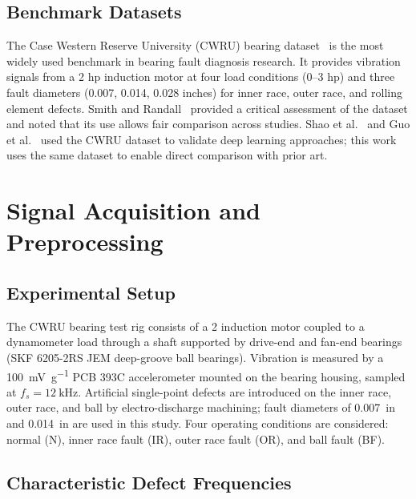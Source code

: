 \documentclass[conference,a4paper]{IEEEtran}[2015/08/26]
\begin{document}
\subsection{Benchmark Datasets}

The Case Western Reserve University (CWRU) bearing dataset~\cite{Loparo2003,
Smith2015} is the most widely used benchmark in bearing fault diagnosis
research. It provides vibration signals from a 2 hp induction motor
at four load conditions (0--3 hp) and three fault diameters
(0.007, 0.014, 0.028 inches) for inner race, outer race, and rolling
element defects. Smith and Randall~\cite{Smith2015} provided a
critical assessment of the dataset and noted that its use allows
fair comparison across studies. Shao et al.~\cite{Shao2017} and
Guo et al.~\cite{Guo2016} used the CWRU dataset to validate deep
learning approaches; this work uses the same dataset to enable
direct comparison with prior art.

\section{Signal Acquisition and Preprocessing}
\label{sec:signal}

\subsection{Experimental Setup}

The CWRU bearing test rig consists of a \SI{2}{\horsepower} induction
motor coupled to a dynamometer load through a shaft supported by drive-end
and fan-end bearings (SKF 6205-2RS JEM deep-groove ball bearings).
Vibration is measured by a \SI{100}{\milli\volt\per\gram} PCB 393C
accelerometer mounted on the bearing housing, sampled at
$f_s = \SI{12}{\kilo\hertz}$. Artificial single-point defects are
introduced on the inner race, outer race, and ball by electro-discharge
machining; fault diameters of \SI{0.007}{in} and \SI{0.014}{in}
are used in this study. Four operating conditions are considered:
normal (N), inner race fault (IR), outer race fault (OR), and ball
fault (BF).

\subsection{Characteristic Defect Frequencies}
\end{document}
